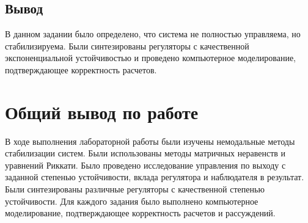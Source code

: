 \documentclass[a4paper, 12pt]{article}
\begin{document}
    \subsection{Вывод}
    В данном задании было определено, что система не полностью управляема, но стабилизируема.
    Были синтезированы регуляторы с качественной экспоненциальной устойчивостью и проведено
    компьютерное моделирование, подтверждающее корректность расчетов.


    \section{Общий вывод по работе}
    В ходе выполнения лабораторной работы были изучены немодальные методы стабилизации систем.
    Были использованы методы матричных неравенств и уравнений Риккати.
    Было проведено исследование управления по выходу с заданной степенью устойчивости, вклада
    регулятора и наблюдателя в результат.
    Были синтезированы различные регуляторы с качественной степенью устойчивости.
    Для каждого задания было выполнено компьютерное моделирование, подтверждающее корректность расчетов и рассуждений.
\end{document}
